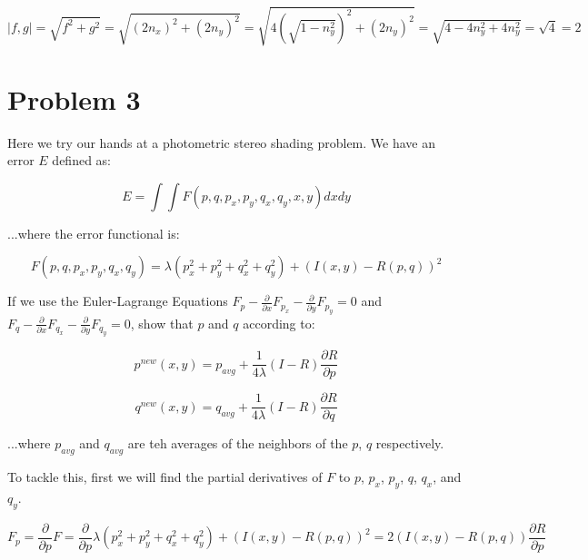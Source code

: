 \documentclass{article}
\begin{document}
\begin{equation}
    |f,g| = \sqrt{f^2 + g^2} = \sqrt{ (2n_x)^2 + (2n_y)^2 } = \sqrt{4(\sqrt{1-n^2_y})^2 + (2n_y)^2} = \sqrt{4 - 4n_y^2 + 4n_y^2} = \sqrt{4} = 2
\end{equation}


\section*{Problem 3}

Here we try our hands at a photometric stereo shading problem. We have an error $E$ defined as:

\begin{equation}
    E = \int\int F(p, q, p_x, p_y, q_x, q_y, x, y) dxdy
\end{equation}

\noindent ...where the error functional is:

\begin{equation}
    F(p, q, p_x, p_y, q_x, q_y) = \lambda(p_x^2 + p_y^2 + q_x^2 + q_y^2) + (I(x,y) - R(p,q))^2
\end{equation}

\noindent If we use the Euler-Lagrange Equations $F_p - \frac{\partial}{\partial x} F_{p_x} - \frac{\partial}{\partial y} F_{p_y} = 0$ and $F_q - \frac{\partial}{\partial x} F_{q_x} - \frac{\partial}{\partial y} F_{q_y} = 0$, show that $p$ and $q$ according to:

\begin{equation}
    p^{new}(x,y) = p_{avg} + \frac{1}{4\lambda}(I-R)\frac{\partial R}{\partial p}
\end{equation}

\begin{equation}
    q^{new}(x,y) = q_{avg} + \frac{1}{4\lambda}(I-R)\frac{\partial R}{\partial q}
\end{equation}

\noindent ...where $p_{avg}$ and $q_{avg}$ are teh averages of the neighbors of the $p$, $q$ respectively.

To tackle this, first we will find the partial derivatives of $F$ to $p$, $p_x$, $p_y$, $q$, $q_x$, and $q_y$.

\begin{equation}
    F_{p} = \frac{\partial}{\partial p} F = \frac{\partial}{\partial p} \lambda(p_x^2 + p_y^2 + q_x^2 + q_y^2) + (I(x,y) - R(p,q))^2 = 2(I(x,y)-R(p,q))\frac{\partial R}{\partial p}
\end{equation}
\end{document}
